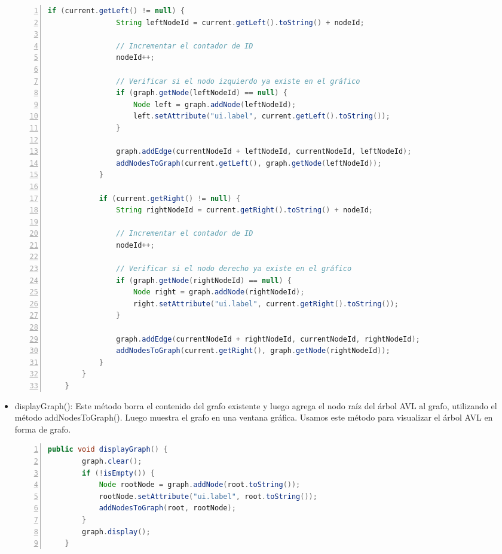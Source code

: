 \documentclass{article}
\begin{document}
\begin{itemize}
\begin{lstlisting}[language=Java, caption={Método addNodesToGraph(NodeAVL<E> current, Node node)}, numbers=left]
            if (current.getLeft() != null) {
                String leftNodeId = current.getLeft().toString() + nodeId;
    
                // Incrementar el contador de ID
                nodeId++;
    
                // Verificar si el nodo izquierdo ya existe en el gráfico
                if (graph.getNode(leftNodeId) == null) {
                    Node left = graph.addNode(leftNodeId);
                    left.setAttribute("ui.label", current.getLeft().toString());
                }
    
                graph.addEdge(currentNodeId + leftNodeId, currentNodeId, leftNodeId);
                addNodesToGraph(current.getLeft(), graph.getNode(leftNodeId));
            }
    
            if (current.getRight() != null) {
                String rightNodeId = current.getRight().toString() + nodeId;
    
                // Incrementar el contador de ID
                nodeId++;
    
                // Verificar si el nodo derecho ya existe en el gráfico
                if (graph.getNode(rightNodeId) == null) {
                    Node right = graph.addNode(rightNodeId);
                    right.setAttribute("ui.label", current.getRight().toString());
                }
    
                graph.addEdge(currentNodeId + rightNodeId, currentNodeId, rightNodeId);
                addNodesToGraph(current.getRight(), graph.getNode(rightNodeId));
            }
        }
    }
                            \end{lstlisting}
                    \item displayGraph(): Este método borra el contenido del grafo existente y luego agrega el nodo raíz del árbol AVL al grafo, utilizando el método addNodesToGraph(). Luego muestra el grafo en una ventana gráfica. Usamos este método para visualizar el árbol AVL en forma de grafo.
                            \begin{lstlisting}[language=Java, caption=Método displayGraph(), numbers=left]
    public void displayGraph() {
        graph.clear();
        if (!isEmpty()) {
            Node rootNode = graph.addNode(root.toString());
            rootNode.setAttribute("ui.label", root.toString());
            addNodesToGraph(root, rootNode);
        }
        graph.display();
    }
                            \end{lstlisting}
                \end{itemize}
\end{document}

